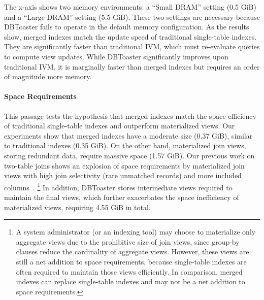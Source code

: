 \documentclass[sigconf, pdfa, nonacm]{acmart}
\begin{document}
\begin{sloppypar}
The x-axis shows two memory environments: a ``Small DRAM'' setting (0.5 GiB) and a ``Large DRAM'' setting (5.5 GiB). These two settings are necessary because DBToaster fails to operate in the default memory configuration.
As the results show, merged indexes match the update speed of traditional single-table indexes. They are significantly faster than traditional IVM, which must re-evaluate queries to compute view updates.
While DBToaster significantly improves upon traditional IVM, it is marginally faster than merged indexes but requires an order of magnitude more memory.
\end{sloppypar}

\paragraph{Space Requirements}

\begin{sloppypar}
This passage tests the hypothesis that merged indexes match the space efficiency of traditional single-table indexes and outperform materialized views.
Our experiments show that merged indexes have a moderate size (0.37 GiB), similar to traditional indexes (0.35 GiB).
On the other hand, materialized join views, storing redundant data, require massive space (1.57 GiB).
Our previous work on two-table joins shows an explosion of space requirements by materialized join views with high join selectivity (rare unmatched records) and more included columns~\cite{lyu2025indexing}.
\footnote{
A system administrator (or an indexing tool) may choose to materialize only aggregate views due to the prohibitive size of join views, since group-by clauses reduce the cardinality of aggregate views.
However, these views are still a net addition to space requirements, because single-table indexes are often required to maintain those views efficiently.
In comparison, merged indexes can replace single-table indexes and may not be a net addition to space requirements.
}
In addition, DBToaster stores intermediate views required to maintain the final views, which further exacerbates the space inefficiency of materialized views, requiring 4.55 GiB in total.
\end{sloppypar}
\end{document}
